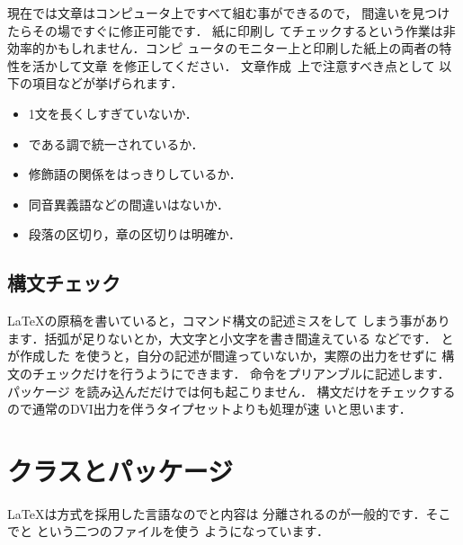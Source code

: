 {現在では文章はコンピュータ上ですべて組む事ができるので，
間違いを見つけたらその場ですぐに修正可能です． 紙に印刷し
てチェックするという作業は非効率的かもしれません．コンピ
ュータのモニター上と印刷した紙上の両者の特性を活かして文章
を修正してください．
文章作成~\cite{HO2004,HO2002,KK1981}上で注意すべき点として
以下の項目などが挙げられます．
\begin{itemize}
 \item 1文を長くしすぎていないか．
 \item である調で統一されているか．
 \item 修飾語の関係をはっきりしているか．
 \item 同音異義語などの間違いはないか．
 \item 段落の区切り，章の区切りは明確か．
\end{itemize}



\subsection{構文チェック\zdash{}}
{\LaTeX}の原稿を書いていると，コマンド構文の記述ミスをして
しまう事があります．括弧が足りないとか，大文字と小文字を書き間違えている
などです．
とが作成した
を使うと，自分の記述が間違っていないか，実際の出力をせずに
構文のチェックだけを行うようにできます．
%
命令をプリアンブルに記述します．パッケージ
を読み込んだだけでは何も起こりません．
%
構文だけをチェックするので通常のDVI出力を伴うタイプセットよりも処理が速
いと思います．



\section{クラスとパッケージ}
{\LaTeX}は方式を採用した言語なのでと内容は
分離されるのが一般的です．そこでと
という二つのファイルを使う
ようになっています．

}
